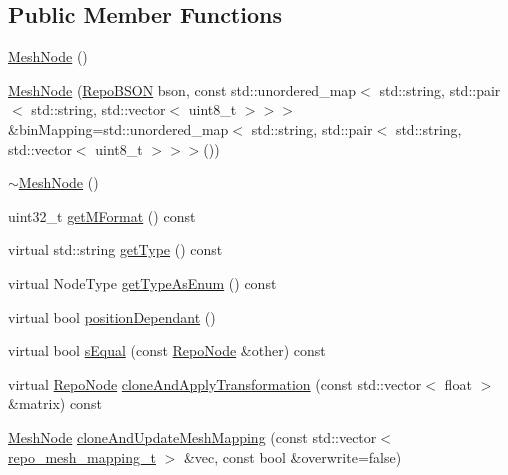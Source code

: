 \subsection*{Public Member Functions}
\begin{DoxyCompactItemize}
\item 
\hyperlink{classrepo_1_1core_1_1model_1_1_mesh_node_ab525cdafcb942a4c79eb517b7ef0f5c7}{Mesh\+Node} ()
\item 
\hyperlink{classrepo_1_1core_1_1model_1_1_mesh_node_a2612d3a4561a24d3b31a9a7de87daf3c}{Mesh\+Node} (\hyperlink{classrepo_1_1core_1_1model_1_1_repo_b_s_o_n}{Repo\+B\+S\+O\+N} bson, const std\+::unordered\+\_\+map$<$ std\+::string, std\+::pair$<$ std\+::string, std\+::vector$<$ uint8\+\_\+t $>$$>$$>$ \&bin\+Mapping=std\+::unordered\+\_\+map$<$ std\+::string, std\+::pair$<$ std\+::string, std\+::vector$<$ uint8\+\_\+t $>$$>$$>$())
\item 
\hyperlink{classrepo_1_1core_1_1model_1_1_mesh_node_abf8b858b11632dc9827b3ffa1cdc8c9b}{$\sim$\+Mesh\+Node} ()
\item 
uint32\+\_\+t \hyperlink{classrepo_1_1core_1_1model_1_1_mesh_node_af55de353138ad754ad2ce9b237010354}{get\+M\+Format} () const 
\item 
virtual std\+::string \hyperlink{classrepo_1_1core_1_1model_1_1_mesh_node_afb8fedac41e86bce0f74509efa6d9614}{get\+Type} () const 
\item 
virtual Node\+Type \hyperlink{classrepo_1_1core_1_1model_1_1_mesh_node_aba656559a131b00514ca844a7e8a595c}{get\+Type\+As\+Enum} () const 
\item 
virtual bool \hyperlink{classrepo_1_1core_1_1model_1_1_mesh_node_a636fc543dbbeca60698e8719c11f945d}{position\+Dependant} ()
\item 
virtual bool \hyperlink{classrepo_1_1core_1_1model_1_1_mesh_node_a58dbc8bb0cdcbbae2e0c6e7558eaef70}{s\+Equal} (const \hyperlink{classrepo_1_1core_1_1model_1_1_repo_node}{Repo\+Node} \&other) const 
\item 
virtual \hyperlink{classrepo_1_1core_1_1model_1_1_repo_node}{Repo\+Node} \hyperlink{classrepo_1_1core_1_1model_1_1_mesh_node_a8f65c14c0c964ee17197135e95e30e3c}{clone\+And\+Apply\+Transformation} (const std\+::vector$<$ float $>$ \&matrix) const 
\item 
\hyperlink{classrepo_1_1core_1_1model_1_1_mesh_node}{Mesh\+Node} \hyperlink{classrepo_1_1core_1_1model_1_1_mesh_node_a7a0ed7c54172f0bab82732c884b8199d}{clone\+And\+Update\+Mesh\+Mapping} (const std\+::vector$<$ \hyperlink{structrepo__mesh__mapping__t}{repo\+\_\+mesh\+\_\+mapping\+\_\+t} $>$ \&vec, const bool \&overwrite=false)

\end{DoxyCompactItemize}
